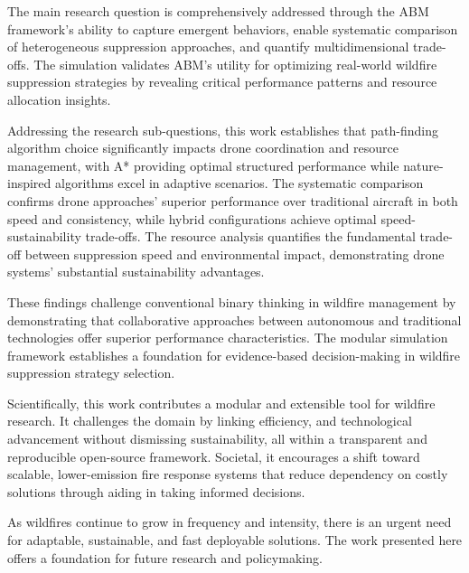 \documentclass[11pt, a4paper]{article}
\begin{document}
The main research question is comprehensively addressed through the ABM framework's ability to capture emergent behaviors, enable systematic comparison of heterogeneous suppression approaches, and quantify multidimensional trade-offs. The simulation validates ABM's utility for optimizing real-world wildfire suppression strategies by revealing critical performance patterns and resource allocation insights.

Addressing the research sub-questions, this work establishes that path-finding algorithm choice significantly impacts drone coordination and resource management, with A* providing optimal structured performance while nature-inspired algorithms excel in adaptive scenarios. The systematic comparison confirms drone approaches' superior performance over traditional aircraft in both speed and consistency, while hybrid configurations achieve optimal speed-sustainability trade-offs. The resource analysis quantifies the fundamental trade-off between suppression speed and environmental impact, demonstrating drone systems' substantial sustainability advantages.

These findings challenge conventional binary thinking in wildfire management by demonstrating that collaborative approaches between autonomous and traditional technologies offer superior performance characteristics. The modular simulation framework establishes a foundation for evidence-based decision-making in wildfire suppression strategy selection.

Scientifically, this work contributes a modular and extensible tool for wildfire research. It challenges the domain by linking efficiency, and technological advancement without dismissing sustainability, all within a transparent and reproducible open-source framework. Societal, it encourages a shift toward scalable, lower-emission fire response systems that reduce dependency on costly solutions through aiding in taking informed decisions.

As wildfires continue to grow in frequency and intensity, there is an urgent need for adaptable, sustainable, and fast deployable solutions. The work presented here offers a foundation for future research and policymaking.




\appendix
\label{app:modellogic}
\end{document}
